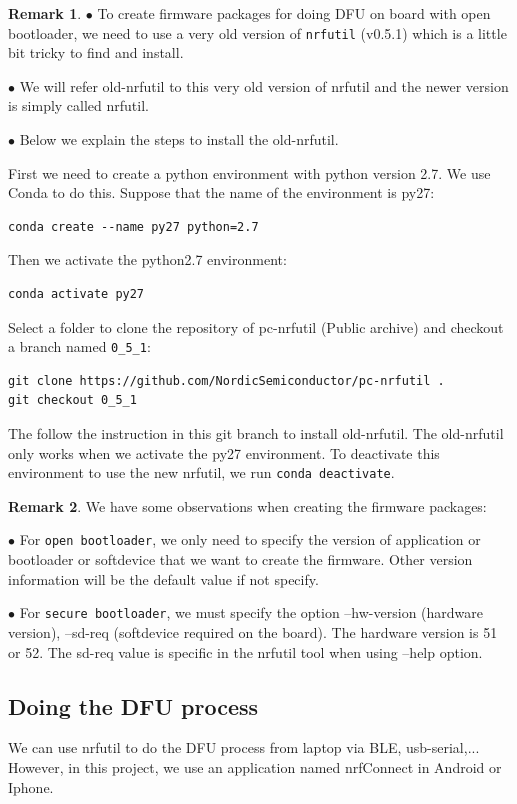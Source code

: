 \documentclass{article}
\theoremstyle{plain}
\theoremstyle{definition}
\newtheorem{remark}{Remark}
\numberwithin{equation}{section}
\begin{document}
\begin{remark}\label{old-nrfutil}
	$ \bullet $ 
	To create firmware packages for doing DFU on board with open bootloader, we need to use a very old version of \texttt{nrfutil} (v0.5.1) which is a little bit tricky to find and install.
	
	$ \bullet $	We will refer old-nrfutil to this very old version of nrfutil and the newer version is simply called nrfutil.
	
	$ \bullet $	Below we explain the steps to install the old-nrfutil.
	
	First we need to create a python environment with python version 2.7. We use Conda to do this. Suppose that the name of the environment is py27:
	\begin{lstlisting}
conda create --name py27 python=2.7
	\end{lstlisting}
	Then we activate the python2.7 environment:
	\begin{lstlisting}
conda activate py27
	\end{lstlisting}
	Select a folder to clone the repository of pc-nrfutil (Public archive) and checkout a branch named \texttt{0\_5\_1}:
	\begin{lstlisting}
git clone https://github.com/NordicSemiconductor/pc-nrfutil .
git checkout 0_5_1
	\end{lstlisting}
	The follow the instruction in this git branch to install old-nrfutil. The old-nrfutil only works when we activate the py27 environment. To deactivate this environment to use the new nrfutil, we run \texttt{conda deactivate}.
\end{remark}


\begin{remark}\label{create firmware}
	We have some observations when creating the firmware packages:
	
	$ \bullet $	For \texttt{open bootloader}, we only need to specify the version of application or bootloader or softdevice that we want to create the firmware. Other version information will be the default value if not specify.
	
	$ \bullet $	For \texttt{secure bootloader}, we must specify the option --hw-version (hardware version), --sd-req (softdevice required on the board). The hardware version is 51 or 52. The sd-req value is specific in the nrfutil tool when using --help option.
\end{remark}


\subsection{Doing the DFU process}
We can use nrfutil to do the DFU process from laptop via BLE, usb-serial,... However, in this project, we use an application named nrfConnect in Android or Iphone.
\end{document}
